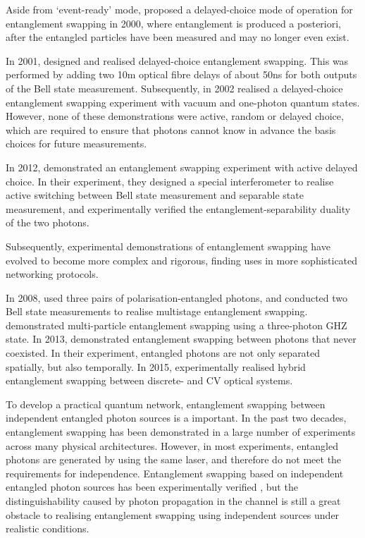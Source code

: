 \documentclass[aps, rmp, twocolumn, amsmath, amssymb, nofootinbib, superscriptaddress, longbibliography, floatfix, table-of-contents, eqsecnum]{revtex4-1}
\begin{document}
Aside from `event-ready' mode, \cite{bib:JMO_47_2} proposed a delayed-choice mode of operation for entanglement swapping in 2000, where entanglement is produced a posteriori, after the entangled particles have been measured and may no longer even exist.

In 2001, \cite{bib:PRL_88_017903} designed and realised delayed-choice entanglement swapping. This was performed by adding two 10m optical fibre delays of about 50ns for both outputs of the Bell state measurement. Subsequently, in 2002 \cite{bib:PRA_66_024309} realised a delayed-choice entanglement swapping experiment with vacuum and one-photon quantum states. However, none of these demonstrations were active, random or delayed choice, which are required to ensure that photons cannot know in advance the basis choices for future measurements.

In 2012, \cite{bib:Nat_Phys_8_479} demonstrated an entanglement swapping experiment with active delayed choice. In their experiment, they designed a special interferometer to realise active switching between Bell state measurement and separable state measurement, and experimentally verified the entanglement-separability duality of the two photons. 

Subsequently, experimental demonstrations of entanglement swapping have evolved to become more complex and rigorous, finding uses in more sophisticated networking protocols.

In 2008, \cite{bib:PRL_101_080403} used three pairs of polarisation-entangled photons, and conducted two Bell state measurements to realise multistage entanglement swapping. \cite{bib:PRL_103_020501} demonstrated multi-particle entanglement swapping using a three-photon GHZ state. In 2013, \cite{bib:PRL_110_210403} demonstrated entanglement swapping between photons that never coexisted. In their experiment, entangled photons are not only separated spatially, but also temporally. In 2015, \cite{bib:PRL_114_100501} experimentally realised hybrid entanglement swapping between discrete- and CV optical systems.

To develop a practical quantum network, entanglement swapping between independent entangled photon sources is a important. In the past two decades, entanglement swapping has been demonstrated in a large number of experiments across many physical architectures. However, in most experiments, entangled photons are generated by using the same laser, and therefore do not meet the requirements for independence. Entanglement swapping based on independent entangled photon sources has been experimentally verified \cite{bib:PRL_96_110501, bib:Nat_Phys_3_692, bib:PRA_79_040302}, but the distinguishability caused by photon propagation in the channel is still a great obstacle to realising entanglement swapping using independent sources under realistic conditions.
\end{document}
